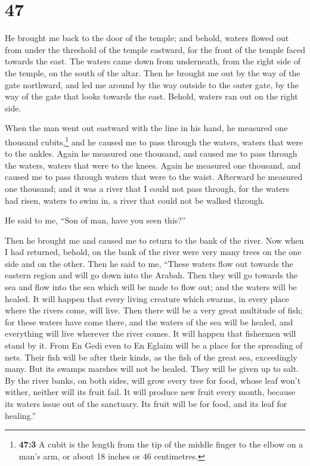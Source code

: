 \hypertarget{section-45}{%
\section{47}\label{section-45}}

 He brought me back to the door of the temple; and behold,
waters flowed out from under the threshold of the temple eastward, for
the front of the temple faced towards the east. The waters came down
from underneath, from the right side of the temple, on the south of the
altar.  Then he brought me out by the way of the gate
northward, and led me around by the way outside to the outer gate, by
the way of the gate that looks towards the east. Behold, waters ran out
on the right side.

 When the man went out eastward with the line in his hand,
he measured one thousand cubits,\footnote{\textbf{47:3} A cubit is the
  length from the tip of the middle finger to the elbow on a man's arm,
  or about 18 inches or 46 centimetres.} and he caused me to pass
through the waters, waters that were to the ankles.  Again
he measured one thousand, and caused me to pass through the waters,
waters that were to the knees. Again he measured one thousand, and
caused me to pass through waters that were to the waist. 
Afterward he measured one thousand; and it was a river that I could not
pass through, for the waters had risen, waters to swim in, a river that
could not be walked through.

 He said to me, ``Son of man, have you seen this?''

Then he brought me and caused me to return to the bank of the river.
 Now when I had returned, behold, on the bank of the river
were very many trees on the one side and on the other. 
Then he said to me, ``These waters flow out towards the eastern region
and will go down into the Arabah. Then they will go towards the sea and
flow into the sea which will be made to flow out; and the waters will be
healed.  It will happen that every living creature which
swarms, in every place where the rivers come, will live. Then there will
be a very great multitude of fish; for these waters have come there, and
the waters of the sea will be healed, and everything will live wherever
the river comes.  It will happen that fishermen will
stand by it. From En Gedi even to En Eglaim will be a place for the
spreading of nets. Their fish will be after their kinds, as the fish of
the great sea, exceedingly many.  But its swamps marshes
will not be healed. They will be given up to salt.  By
the river banks, on both sides, will grow every tree for food, whose
leaf won't wither, neither will its fruit fail. It will produce new
fruit every month, because its waters issue out of the sanctuary. Its
fruit will be for food, and its leaf for healing.''

